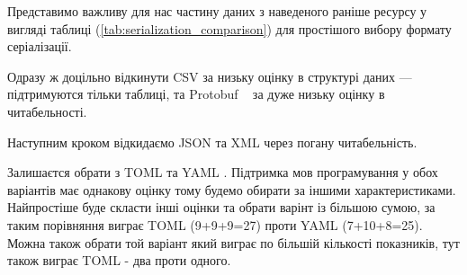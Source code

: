 \documentclass[14pt]{extarticle}
\begin{document}
  Представимо важливу для нас частину даних з наведеного раніше ресурсу
  у вигляді таблиці (\ref{tab:serialization_comparison})
  для простішого вибору формату серіалізації.

  \begin{table}
    \centering
  \end{table}

  Одразу ж доцільно відкинути CSV \cite{wiki_csv}
  за низьку оцінку в структурі даних --- підтримуются тільки таблиці,
  та Protobuf ~\cite{wiki_protobuf} за дуже низьку оцінку в читабельності.

  Наступним кроком відкидаємо JSON \cite{wiki_json}
  та XML \cite{wiki_xml} через погану читабельність.

  Залишаєтся обрати з TOML \cite{wiki_toml} та YAML \cite{wiki_yaml}.
  Підтримка мов програмування у обох
  варіантів має однакову оцінку тому будемо обирати за іншими характеристиками.
  Найпростіше буде скласти інші оцінки та обрати варінт із більшою сумою,
  за таким порівняння виграє TOML (9+9+9=27) проти YAML (7+10+8=25).
  Можна також обрати той варіант який виграє по більшій кількості показників,
  тут також виграє TOML - два проти одного.
\end{document}
